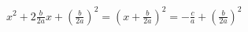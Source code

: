\documentclass[preview]{standalone}
\begin{document}
\begin{center}
$x^2 + 2\frac{b}{2a}x + \left( \frac{b}{2a} \right)^2 = \left( x + \frac{b}{2a} \right)^2 = - \frac{c}{a} + \left( \frac{b}{2a} \right)^2$
\end{center}
\end{document}
